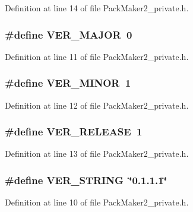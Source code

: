 Definition at line 14 of file Pack\-Maker2\_\-private.h.
\subsubsection{\setlength{\rightskip}{0pt plus 5cm}\#define VER\_\-MAJOR~0}\label{_pack_maker2__private_8h_e9b0873c1004a01651f733d556db118c}




Definition at line 11 of file Pack\-Maker2\_\-private.h.
\subsubsection{\setlength{\rightskip}{0pt plus 5cm}\#define VER\_\-MINOR~1}\label{_pack_maker2__private_8h_d78650efa42849c5f86d372f11f26403}




Definition at line 12 of file Pack\-Maker2\_\-private.h.
\subsubsection{\setlength{\rightskip}{0pt plus 5cm}\#define VER\_\-RELEASE~1}\label{_pack_maker2__private_8h_3addb24971814c8e78cf3872dd643a48}




Definition at line 13 of file Pack\-Maker2\_\-private.h.
\subsubsection{\setlength{\rightskip}{0pt plus 5cm}\#define VER\_\-STRING~\char`\"{}0.1.1.1\char`\"{}}\label{_pack_maker2__private_8h_ec977eff8d77d9c22f46665015a6f239}




Definition at line 10 of file Pack\-Maker2\_\-private.h.